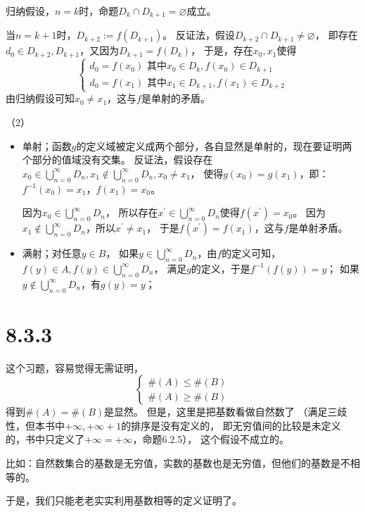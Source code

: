 \documentclass{article}
\begin{document}
归纳假设，$n = k$时，命题$D_{k} \cap D_{k+1} = \varnothing$成立。

当$n = k+1$时，$D_{k+2} := f(D_{k+1})$。
反证法，假设$D_{k+2} \cap D_{k+1} \neq \varnothing$，
即存在$d_0 \in D_{k+2}, D_{k+1}$，又因为$D_{k+1} = f(D_k)$，
于是，存在$x_0, x_1$使得
\begin{equation*}
  \begin{cases*}
    d_0 = f(x_0) \text{ 其中} x_0 \in D_k, f(x_0) \in D_{k+1} \\
    d_0 = f(x_{1}) \text{ 其中}  x_{1} \in D_{k+1}, f(x_1) \in D_{k+2}
  \end{cases*}
\end{equation*}
由归纳假设可知$x_0 \neq x_1$，这与$f$是单射的矛盾。

（2）
\begin{itemize}
  \item 单射；函数$g$的定义域被定义成两个部分，各自显然是单射的，现在要证明两个部分的值域没有交集。
        反证法，假设存在$x_0 \in \bigcup \limits_{n=0}^\infty D_n, x_1 \not \in \bigcup \limits_{n=0}^\infty D_n, x_0 \neq x_1$，
        使得$g(x_0) = g(x_1)$，即：$f^{-1}(x_0) = x_1$，$f(x_1) = x_0$。

        因为$x_0 \in \bigcup \limits_{n=0}^\infty D_n$，
        所以存在$x^\prime \in \bigcup \limits_{n=0}^\infty D_n$使得$f(x^\prime) = x_0$。
        因为$x_1 \not \in \bigcup \limits_{n=0}^\infty D_n$，所以$x^\prime \neq x_1$，
        于是$f(x^\prime) = f(x_1)$，这与$f$是单射矛盾。


  \item 满射；对任意$y \in B$，
        如果$y \in \bigcup \limits_{n=0}^\infty D_n$，由$f$的定义可知，
        $f(y) \in A, f(y) \in \bigcup \limits_{n=0}^\infty D_n$，
        满足$g$的定义，于是$f^{-1}(f(y)) = y$；
        如果$y \not \in \bigcup \limits_{n=0}^\infty D_n$，有$g(y) = y$；
\end{itemize}

\section*{8.3.3}

\begin{zremark}
  这个习题，容易觉得无需证明，
  \begin{equation*}
    \begin{cases*}
      \#(A) \leq \#(B) \\
      \#(A) \geq \#(B)
    \end{cases*}
  \end{equation*}
  得到$\#(A) = \#(B)$是显然。
  但是，这里是把基数看做自然数了
  （满足三歧性，但本书中$+\infty,+\infty + 1$的排序是没有定义的，
  即无穷值间的比较是未定义的，书中只定义了$+\infty = +\infty$，命题6.2.5），
  这个假设不成立的。
  
  比如：自然数集合的基数是无穷值，实数的基数也是无穷值，但他们的基数是不相等的。

  于是，我们只能老老实实利用基数相等的定义证明了。
\end{zremark}
\end{document}
